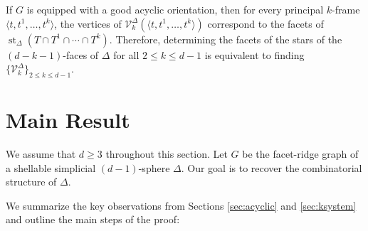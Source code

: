 \documentclass[11pt,twoside]{article}
\theoremstyle{definition}
\newcommand{\cV}{\mathcal{V}}
\DeclareMathOperator{\st}{st}
\begin{document}
If $G$ is equipped with a good acyclic orientation, then for every principal $k$-frame $\langle t, t^1, \dots, t^k \rangle$, the vertices of $\cV^\Delta_k(\langle t, t^1, \dots, t^k \rangle)$ correspond to the facets of $\st_\Delta (T\cap T^1 \cap \cdots \cap T^k)$. Therefore, determining the facets of the stars of the $(d-k-1)$-faces of $\Delta$ for all $2 \le k \le d-1$ is equivalent to finding $\{\cV^\Delta_k\}_{2 \le k \le d-1}$. 



























\section{Main Result}\label{sec:main}
We assume that $d \ge 3$ throughout this section. Let $G$ be the facet-ridge graph of a shellable simplicial $(d-1)$-sphere $\Delta$. Our goal is to recover the combinatorial structure of $\Delta$.

We summarize the key observations from Sections \ref{sec:acyclic} and \ref{sec:ksystem} and outline the main steps of the proof:
\end{document}
